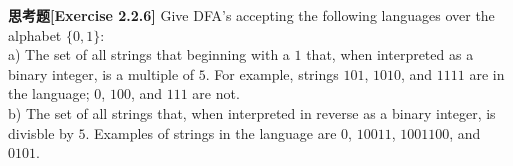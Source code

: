 \textbf{思考题[Exercise 2.2.6]} Give DFA's accepting the following languages 
over the alphabet $\{0,1\}$:\\
a) The set of all strings that beginning with a $1$ that, when interpreted
as a binary integer, is a multiple of $5$. For example, strings $101$, 
$1010$, and $1111$ are in the language; $0$, $100$, and $111$ are not.\\
b) The set of all strings that, when interpreted in reverse as a binary 
integer, is divisble by $5$. Examples of strings in the language are $0$, 
$10011$, $1001100$, and $0101$. 
